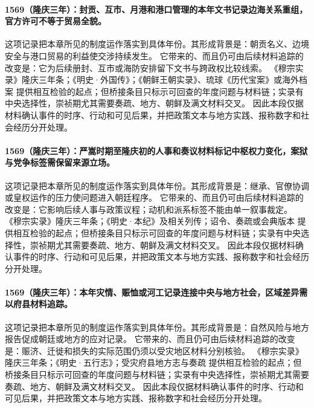 \paragraph{1569（隆庆三年）：封贡、互市、月港和港口管理的本年文书记录边海关系重组，官方许可不等于贸易全貌。} 这项记录把本章所见的制度运作落实到具体年份。其形成背景是：朝贡名义、边境安全与港口贸易的利益使交涉持续发生。 它带来的、而且仍可由后续材料追踪的改变是：它为后续册封、互市或海防安排留下文书与跨政权比较线索。 《穆宗实录》隆庆三年条；《明史·外国传》；《朝鲜王朝实录》、琉球《历代宝案》或海外档案 提供相互检验的起点；但桥接条目只标示可回查的年度问题与材料链；实录有中央选择性，崇祯期尤其需要奏疏、地方、朝鲜及满文材料交叉。 因此本段仅据材料确认事件的时序、行动和可见后果，并把政策文本与地方实践、报称数字和社会经历分开处理。

\paragraph{1569（隆庆三年）：严嵩时期至隆庆初的人事和奏议材料标记中枢权力变化，案狱与党争标签需保留来源立场。} 这项记录把本章所见的制度运作落实到具体年份。其形成背景是：继承、官僚协调或皇权运作的压力使问题进入朝廷程序。 它带来的、而且仍可由后续材料追踪的改变是：它影响后续人事与政策议程；动机和派系标签不能由单一叙事裁定。 《穆宗实录》隆庆三年条；《明史·本纪》及相关列传；诏令、奏疏或会典版本 提供相互检验的起点；但桥接条目只标示可回查的年度问题与材料链；实录有中央选择性，崇祯期尤其需要奏疏、地方、朝鲜及满文材料交叉。 因此本段仅据材料确认事件的时序、行动和可见后果，并把政策文本与地方实践、报称数字和社会经历分开处理。

\paragraph{1569（隆庆三年）：本年灾情、赈恤或河工记录连接中央与地方社会，区域差异需以府县材料追踪。} 这项记录把本章所见的制度运作落实到具体年份。其形成背景是：自然风险与地方报告促成朝廷或地方的应对记录。 它带来的、而且仍可由后续材料追踪的改变是：赈济、迁徙和损失的实际范围仍须以受灾地区材料分别核验。 《穆宗实录》隆庆三年条；《明史·五行志》；受灾府县地方志与奏疏 提供相互检验的起点；但桥接条目只标示可回查的年度问题与材料链；实录有中央选择性，崇祯期尤其需要奏疏、地方、朝鲜及满文材料交叉。 因此本段仅据材料确认事件的时序、行动和可见后果，并把政策文本与地方实践、报称数字和社会经历分开处理。

